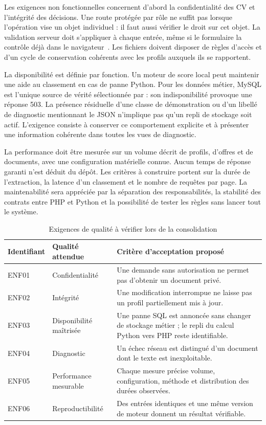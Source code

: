 Les exigences non fonctionnelles concernent d'abord la confidentialité des CV et l'intégrité des décisions. Une route protégée par rôle ne suffit pas lorsque l'opération vise un objet individuel : il faut aussi vérifier le droit sur cet objet. La validation serveur doit s'appliquer à chaque entrée, même si le formulaire la contrôle déjà dans le navigateur~\cite{laravel-validation}. Les fichiers doivent disposer de règles d'accès et d'un cycle de conservation cohérents avec les profils auxquels ils se rapportent.

La disponibilité est définie par fonction. Un moteur de score local peut maintenir une aide au classement en cas de panne Python. Pour les données métier, MySQL est l'unique source de vérité sélectionnée par  : son indisponibilité provoque une réponse 503. La présence résiduelle d'une classe de démonstration ou d'un libellé de diagnostic mentionnant le JSON n'implique pas qu'un repli de stockage soit actif. L'exigence consiste à conserver ce comportement explicite et à présenter une information cohérente dans toutes les vues de diagnostic.

La performance doit être mesurée sur un volume décrit de profils, d'offres et de documents, avec une configuration matérielle connue. Aucun temps de réponse garanti n'est déduit du dépôt. Les critères à construire portent sur la durée de l'extraction, la latence d'un classement et le nombre de requêtes par page. La maintenabilité sera appréciée par la séparation des responsabilités, la stabilité des contrats entre PHP et Python et la possibilité de tester les règles sans lancer tout le système.

\begin{table}[htbp]
\centering
\small
\caption{Exigences de qualité à vérifier lors de la consolidation}
\label{tab:exigences-qualite}
\begin{tabularx}{\textwidth}{@{}P{0.13\textwidth}P{0.25\textwidth}X@{}}
\toprule
Identifiant & Qualité attendue & Critère d'acceptation proposé \\
\midrule
ENF01 & Confidentialité & Une demande sans autorisation ne permet pas d'obtenir un document privé. \\
ENF02 & Intégrité & Une modification interrompue ne laisse pas un profil partiellement mis à jour. \\
ENF03 & Disponibilité maîtrisée & Une panne SQL est annoncée sans changer de stockage métier ; le repli du calcul Python vers PHP reste identifiable. \\
ENF04 & Diagnostic & Un échec réseau est distingué d'un document dont le texte est inexploitable. \\
ENF05 & Performance mesurable & Chaque mesure précise volume, configuration, méthode et distribution des durées observées. \\
ENF06 & Reproductibilité & Des entrées identiques et une même version de moteur donnent un résultat vérifiable. \\
\bottomrule
\end{tabularx}
\end{table}

